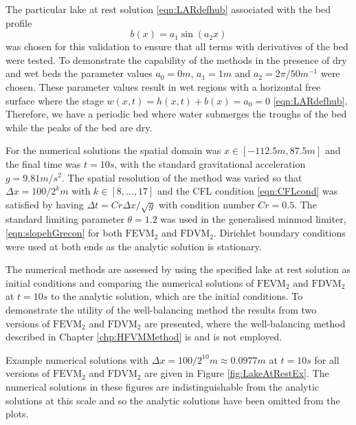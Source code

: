 The particular lake at rest solution \eqref{eqn:LARdefhub} associated with the bed profile
\begin{equation}
b(x) = a_1 \sin\left(a_2 x\right)
\end{equation}
was chosen for this validation to ensure that all terms with derivatives of the bed were tested. To demonstrate the capability of the methods in the presence of dry and wet beds the parameter values $a_0 = 0m$, $a_1 = 1m$ and $a_2 = 2 \pi / 50 m^{-1} $ were chosen. These parameter values result in wet regions with a horizontal free surface where the stage $w(x,t)= h(x,t) + b(x) =a_0= 0$ \eqref{eqn:LARdefhub}. Therefore, we have a periodic bed where water submerges the troughs of the bed while the peaks of the bed are dry. 

For the numerical solutions the spatial domain was $x \in \left[-112.5 m,87.5 m\right]$ and the final time was $t=10s$, with the standard gravitational acceleration $g= 9.81 m/s^2$. The spatial resolution of the method was varied so that $\Delta x = 100 / 2^k m$ with $k \in \left[8, \dots ,17\right]$ and the CFL condition \eqref{eqn:CFLcond} was satisfied by having $\Delta t = Cr \Delta x / \sqrt{g}$ with condition number $Cr = 0.5$. The standard limiting parameter $\theta = 1.2$ was used in the generalised minmod limiter, \eqref{eqn:slopehGrecon} for both $\text{FEVM}_2$ and $\text{FDVM}_2$. Dirichlet boundary conditions were used at both ends as the analytic solution is stationary.

The numerical methods are assessed by using the specified lake at rest solution as initial conditions and comparing the numerical solutions of $\text{FEVM}_2$ and $\text{FDVM}_2$ at $t=10s$ to the analytic solution, which are the initial conditions. To demonstrate the utility of the well-balancing method the results from two versions of $\text{FEVM}_2$ and $\text{FDVM}_2$ are presented, where the well-balancing method described in Chapter \ref{chp:HFVMMethod} is and is not employed. 

Example numerical solutions with $\Delta x = 100/2^{10}m \approx 0.0977m$ at $t=10s$ for all versions of $\text{FEVM}_2$ and $\text{FDVM}_2$ are given in Figure \ref{fig:LakeAtRestEx}. The numerical solutions in these figures are indistinguishable from the analytic solutions at this scale and so the analytic solutions have been omitted from the plots. 


